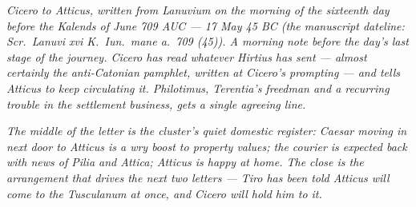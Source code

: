 
\textit{Cicero to Atticus, written from Lanuvium on
the morning of the sixteenth day before the Kalends of
June 709 AUC --- 17 May 45 BC (the manuscript
dateline: \textit{Scr.\ Lanuvi xvi K.\ Iun.\ mane a.\
709 (45)}). A morning note before the day's last
stage of the journey. Cicero has read whatever Hirtius
has sent --- almost certainly the anti-Catonian
pamphlet, written at Cicero's prompting --- and tells
Atticus to keep circulating it. Philotimus, Terentia's
freedman and a recurring trouble in the settlement
business, gets a single agreeing line.}

\textit{The middle of the letter is the cluster's
quiet domestic register: Caesar moving in next door to
Atticus is a wry boost to property values; the
courier is expected back with news of Pilia and
Attica; Atticus is happy at home. The close is the
arrangement that drives the next two letters --- Tiro
has been told Atticus will come to the Tusculanum at
once, and Cicero will hold him to it.}
